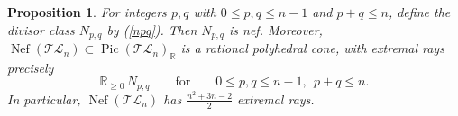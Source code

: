 \documentclass[10pt]{amsart}
\newtheorem{proposition}[theorem]{Proposition}
\theoremstyle{definition}
\newcommand{\R}{\mathbb{R}}
\newcommand{\Pic}{\operatorname{Pic}}
\newcommand{\Nef}{\operatorname{Nef}}
\DeclareMathOperator{\prim}{prim}
\newcommand{\TL}{\mathcal{TL}}
\theoremstyle{plain} %
\begin{document}


\begin{proposition}\label{prop:nef-cone}
For integers $p,q$ with $0\le p,q\le n-1$ and $p+q\le n$, define the divisor class $N_{p,q}$ by (\ref{npq}). Then $N_{p,q}$ is nef. Moreover, $\Nef(\TL_n)\subset \Pic(\TL_n)_\R$ is a rational polyhedral cone, with extremal rays precisely
\[
\R_{\ge 0}\,N_{p,q}
\qquad\text{for}\qquad
0\le p,q\le n-1,\ \ p+q\le n.
\]
In particular, $\Nef(\TL_n)$ has $\frac{n^2+3n-2}{2}$ extremal rays.
\end{proposition}
\end{document}
